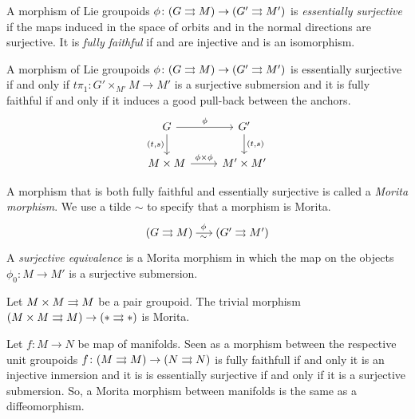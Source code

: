 %
%

A morphism of Lie groupoids $\phi\colon(G\rightrightarrows M)\to(G'\rightrightarrows M')$ is \emph{essentially surjective} if the maps induced in the space of orbits  and in the normal directions  are surjective.
%
It is \emph{fully faithful} if  and  are injective and  is an isomorphism.

\begin{prop}\label{prop:dhfgpds}
A morphism of Lie groupoids $\phi\colon(G\rightrightarrows M)\to(G'\rightrightarrows M')$ is essentially surjective if and only if $t\pi_1\colon G'\times_{M'} M\to M'$ is a surjective submersion and it is fully faithful if and only if it induces a good pull-back between the anchors.
\begin{equation}
\begin{tikzcd}
 G \ar{r}{\phi} \ar{d}[swap]{(t, s)} & G' \ar{d}{(t, s)} \\
 M\times M \ar{r}{\phi\times\phi} & M'\times M'
\end{tikzcd}
\end{equation}
\end{prop}

A morphism that is both fully faithful and essentially surjective is called a \emph{Morita morphism}.
We use a tilde $\sim$ to specify that a morphism is Morita.
\[ \begin{tikzcd}[sep = small]
 (G\tto M) \ar[shorten = -.15em]{r}[pos=.45, sloped, below]{\sim}[pos=.45, sloped, above]{\phi} & (G'\tto M')
\end{tikzcd} \]
%
A \emph{surjective equivalence} is a Morita morphism in which the map on the objects $\phi_0\colon M\to M'$ is a surjective submersion.

\begin{example}
Let $M\times M\rightrightarrows M$ be a pair groupoid.
The trivial morphism $(M\times M\rightrightarrows M) \to (*\rightrightarrows *)$ is Morita.
\end{example}

\begin{example}
Let $f\colon M\to N$ be map of manifolds.
Seen as a morphism between the respective unit groupoids $f\colon (M\rightrightarrows M) \to (N\rightrightarrows N)$ is fully faithfull if and only it is an injective inmersion and it is is essentially surjective if and only if it is a surjective submersion.
So, a Morita morphism between manifolds is the same as a diffeomorphism.
\end{example}

